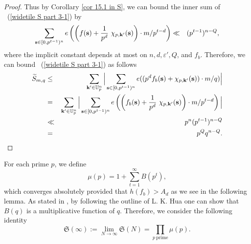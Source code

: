 \documentclass[12pt]{amsart}
\theoremstyle{definition}
\theoremstyle{remark}
\numberwithin{equation}{section}
\begin{document}
\begin{proof}
Thus by Corollary \ref{cor 15.1 in S}, we can bound the inner sum of ~(\ref{widetile S part 3-1}) by
\begin{eqnarray}
\sum_{ \mathbf{s} \in [0, p^{t-1})^n  } e \left( \left( f( \mathbf{s}) + \frac{1}{p^d} \ \chi_{p, \mathbf{k}'}(\mathbf{s}) \right) \cdot {m}/ p^{t-d} \right)
&\ll&
\notag (p^{t-1})^{n - Q},
\end{eqnarray}
where the implicit constant depends at most on $n,d, \varepsilon', Q$, and $ {f_b}$.
Therefore, we can bound ~(\ref{widetile S part 3-1}) as follows
\begin{eqnarray}
\widetilde{S}_{{m}, q } &\leq&
\sum_{\mathbf{k}' \in \mathbb{U}_p^n} \Big{|} \sum_{ \mathbf{s} \in [0, p^{t-1})^n   } e( (p^d  f_b( \mathbf{s}) + \chi_{p, \mathbf{k}'}(\mathbf{s})) \cdot  {m}/q ) \Big{|}
\notag
\\
&=&
\sum_{\mathbf{k}' \in \mathbb{U}_p^n} \Big{|} \sum_{ \mathbf{s} \in [0, p^{t-1})^n  } e \left( \left( f_b( \mathbf{s}) + \frac{1}{p^d} \ \chi_{p, \mathbf{k}'}(\mathbf{s}) \right) \cdot  {m}/ p^{t-d} \right) \Big{|}
\notag
\\
&\ll&
p^n (p^{t-1})^{n - Q}
\notag
\\
&=&
p^{Q} q^{n - Q}.
\notag
\end{eqnarray}

\end{proof}

For each prime $p$, we define
\begin{equation}
\label{def mu p}
\mu(p) =  1  + \sum_{t=1}^{\infty} B( p^t),
\end{equation}
which converges absolutely provided that $h(f_b) > A_d$ as we see in the following lemma.
As stated in \cite{CM}, by following the outline of L. K. Hua \cite[Chapter VII, \S 2, Lemma 8.1]{H} one can show that $B(q)$
is a multiplicative function of $q$. Therefore, we consider the following identity
\begin{equation}
\label{def sigular series}
\mathfrak{S}(\infty) := \lim_{N \rightarrow \infty} \mathfrak{S}(N) = \prod_{p \ \text{prime}} \mu(p).
\end{equation}
\end{document}
